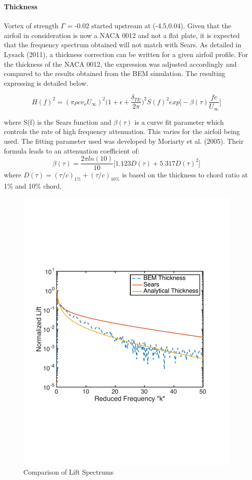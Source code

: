 \documentclass{article}
\begin{document}
\noindent \textbf{Thickness} \\ \\
Vortex of strength $\Gamma$ = -0.02 started upstream at (-4.5,0.04). Given that the airfoil in consideration is now a NACA 0012 and not a flat plate, it is expected that the frequency spectrum obtained will not match with Sears. As detailed in Lysack (2011), a thickness correction can be written for a given airfoil profile. For the thickness of the NACA 0012, the expression was adjusted accordingly and compared to the results obtained from the BEM simulation. The resulting expressing is detailed below. 

\begin{equation}
H(f)^2 = (\pi \rho c v_o U_{\infty})^2\Bigg(1 + \epsilon + \frac{\delta_{TE}}{2\pi} \Bigg )^2 S(f)^2 exp\Bigg[-\beta(\tau)\frac{fc}{U_{\infty}}\Bigg]
\end{equation}

where S(f) is the Sears function and $\beta(\tau)$ is a curve fit parameter which controls the rate of high frequency attenuation. This varies for the airfoil being used. The fitting parameter used was developed by Moriarty et al. (2005). Their formula leads to an attenuation coefficient of: 
\begin{equation}
\beta(\tau) = \frac{2\pi ln(10)}{10} \big[1.123D(\tau) + 5.317D(\tau)^2 \big]
\end{equation}
where $D(\tau) = (\tau/c)_{1\%} + (\tau/c)_{10\%}$ is based on the thickness to chord ratio at 1$\%$ and 10$\%$ chord. 

\begin{figure}[h]
\includegraphics[width = 4 in, height = 3 in]{BEM_Compare}
\centering
\caption{Comparison of Lift Spectrums}
\end{figure}
\end{document}
